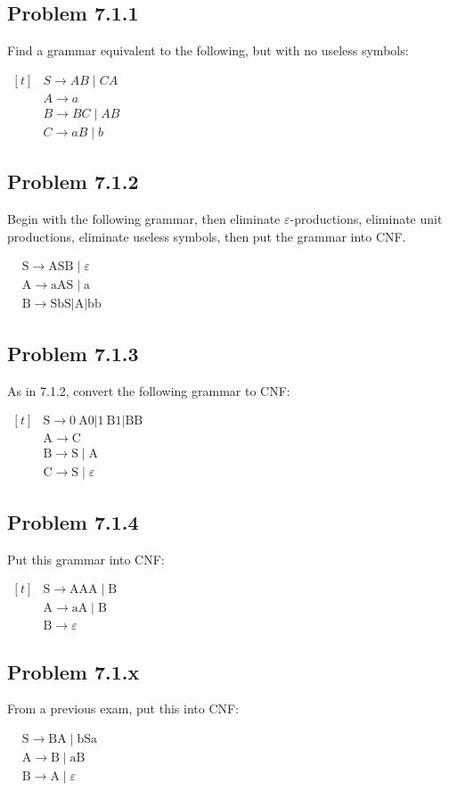\documentclass[12pt]{scrbook}
\begin{document}
\subsection*{Problem 7.1.1}Find a grammar equivalent to the following, but with no useless symbols:

$ \begin{aligned}[t]
& S \rightarrow A B \mid C A \\
& A \rightarrow a \\
& B \rightarrow B C \mid A B \\
& C \rightarrow a B \mid b
\end{aligned} $

\newpage
\subsection*{Problem 7.1.2}Begin with the following grammar, then eliminate $\varepsilon$-productions, eliminate unit productions, eliminate useless symbols, then put the grammar into CNF.

$ \begin{aligned}
& \mathrm{S} \rightarrow \mathrm{ASB} \mid \varepsilon \\
& \mathrm{A} \rightarrow \mathrm{aAS} \mid \mathrm{a} \\
& \mathrm{B} \rightarrow \mathrm{SbS}|\mathrm{A}| \mathrm{bb}
\end{aligned} $

\subsection*{Problem 7.1.3}As in 7.1.2, convert the following grammar to CNF:

$ \begin{aligned}[t]
& \mathrm{S} \rightarrow 0 \mathrm{~A} 0|1 \mathrm{~B} 1| \mathrm{BB} \\
& \mathrm{A} \rightarrow \mathrm{C} \\
& \mathrm{B} \rightarrow \mathrm{S} \mid \mathrm{A} \\
& \mathrm{C} \rightarrow \mathrm{S} \mid \varepsilon
\end{aligned} $

\subsection*{Problem 7.1.4}Put this grammar into CNF:

$\begin{aligned}[t]
& \mathrm{S} \rightarrow \mathrm{AAA} \mid \mathrm{B} \\
& \mathrm{A} \rightarrow \mathrm{aA} \mid \mathrm{B} \\
& \mathrm{B} \rightarrow \varepsilon
\end{aligned}$

\subsection*{Problem 7.1.x}From a previous exam, put this into CNF:

$\begin{aligned}
& \mathrm{S} \rightarrow \mathrm{BA} \mid \mathrm{bSa} \\
& \mathrm{A} \rightarrow \mathrm{B} \mid \mathrm{aB} \\
& \mathrm{B} \rightarrow \mathrm{A} \mid \varepsilon
\end{aligned}$
\end{document}
